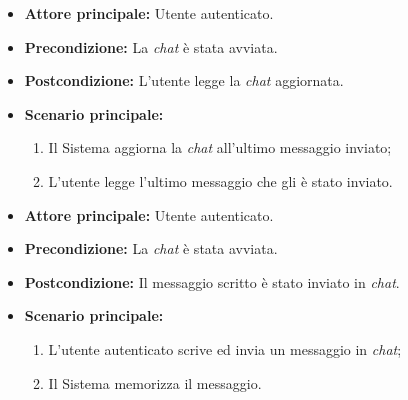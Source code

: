 \label{usecase:Lettura chat}
\begin{itemize}
	\item \textbf{Attore principale:} Utente autenticato.

	\item \textbf{Precondizione:} La \textit{chat} è stata avviata.

	\item \textbf{Postcondizione:} L'utente legge la \textit{chat} aggiornata.

	\item \textbf{Scenario principale:}
	      \begin{enumerate}
		      \item Il Sistema aggiorna la \textit{chat} all'ultimo messaggio inviato;
		      \item L'utente legge l'ultimo messaggio che gli è stato inviato.
	      \end{enumerate}
\end{itemize}


\label{usecase:Invio messaggio chat}
\begin{itemize}
	\item \textbf{Attore principale:} Utente autenticato.

	\item \textbf{Precondizione:} La \textit{chat} è stata avviata.


	\item \textbf{Postcondizione:} Il messaggio scritto è stato inviato in \textit{chat}.

	\item \textbf{Scenario principale:}
	      \begin{enumerate}
		      \item L'utente autenticato scrive ed invia un messaggio in \textit{chat};
		      \item Il Sistema memorizza il messaggio.
	      \end{enumerate}
\end{itemize}
